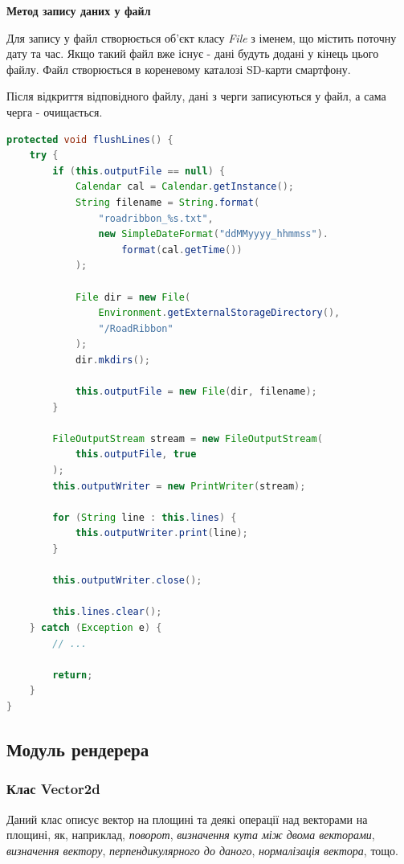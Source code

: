 \documentclass[simple,a4paper,14pt,ukrainian,utf8]{eskdtext}
\begin{document}
        	\textbf{Метод запису даних у файл}
        	
        	Для запису у файл створюється об’єкт класу \textit{File} з іменем, що містить поточну дату та час. Якщо такий файл вже існує - дані будуть додані у кінець цього файлу. Файл створюється в кореневому каталозі SD-карти смартфону.
        	
        	Після відкриття відповідного файлу, дані з черги записуються у файл, а сама черга - очищається.
        	
\begin{lstlisting}[language=Java]
protected void flushLines() {
    try {
        if (this.outputFile == null) {
            Calendar cal = Calendar.getInstance();
            String filename = String.format(
            	"roadribbon_%s.txt",
                new SimpleDateFormat("ddMMyyyy_hhmmss").
                	format(cal.getTime())
            );

            File dir = new File(
            	Environment.getExternalStorageDirectory(), 
            	"/RoadRibbon"
            );
            dir.mkdirs();

            this.outputFile = new File(dir, filename);
        }

        FileOutputStream stream = new FileOutputStream(
        	this.outputFile, true
        );
        this.outputWriter = new PrintWriter(stream);

        for (String line : this.lines) {
            this.outputWriter.print(line);
        }

        this.outputWriter.close();

        this.lines.clear();
    } catch (Exception e) {
        // ...

        return;
    }
}
\end{lstlisting}
        
     \subsection{Модуль рендерера}
     
     	\subsubsection{Клас Vector2d}
     	
     		Даний клас описує вектор на площині та деякі операції над векторами на площині, як, наприклад, \textit{поворот}, \textit{визначення кута між двома векторами}, \textit{визначення вектору}, \textit{перпендикулярного до даного}, \textit{нормалізація вектора}, тощо.
     	
\end{document}
